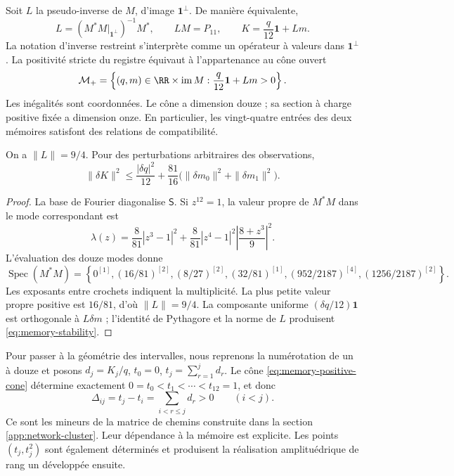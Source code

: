 Soit \(L\) la pseudo-inverse de \(M\), d’image
\(\mathbf1^\perp\). De manière équivalente,
\[
 L=\left(M^*M\big|_{\mathbf1^\perp}\right)^{-1}M^*,
 \qquad LM=P_{11},\qquad K=\frac q{12}\mathbf1+Lm.
\]
La notation d’inverse restreint s’interprète comme un opérateur à
valeurs dans \(\mathbf1^\perp\). La positivité stricte du registre
équivaut à l’appartenance au cône ouvert
\begin{equation}
 \mathcal M_+=\left\{(q,m)\in\RR\times\operatorname{im}M:
 \frac q{12}\mathbf1+Lm>0\right\}.
 \label{eq:memory-positive-cone}
\end{equation}
Les inégalités sont coordonnées. Le cône a dimension douze ; sa section
à charge positive fixée a dimension onze. En particulier, les vingt-quatre
entrées des deux mémoires satisfont des relations de compatibilité.

\begin{proposition}
\label{prop:memory-stability}
On a \(\|L\|=9/4\). Pour des perturbations arbitraires des observations,
\begin{equation}
 \|\delta K\|^2\leq\frac{|\delta q|^2}{12}
 +\frac{81}{16}\bigl(\|\delta m_0\|^2+\|\delta m_1\|^2\bigr).
 \label{eq:memory-stability}
\end{equation}
\end{proposition}
\begin{proof}
La base de Fourier diagonalise \(\mathsf S\). Si \(z^{12}=1\), la valeur propre de \(M^*M\) dans le mode correspondant est
\[
 \lambda(z)=\frac8{81}|z^3-1|^2
 +\frac8{81}|z^4-1|^2\left|\frac{8+z^3}{9}\right|^2.
\]
L’évaluation des douze modes donne
\[
 \operatorname{Spec}(M^*M)=
 \left\{0^{[1]},(16/81)^{[2]},(8/27)^{[2]},(32/81)^{[1]},
 (952/2187)^{[4]},(1256/2187)^{[2]}\right\}.
\]
Les exposants entre crochets indiquent la multiplicité. La plus petite valeur propre
positive est \(16/81\), d’où \(\|L\|=9/4\). La composante uniforme
\((\delta q/12)\mathbf1\) est orthogonale à \(L\delta m\) ; l’identité
de Pythagore et la norme de \(L\) produisent \eqref{eq:memory-stability}.
\end{proof}

Pour passer à la géométrie des intervalles, nous reprenons la numérotation de un à douze
et posons \(d_j=K_j/q\), \(t_0=0\),
\(t_j=\sum_{r=1}^j d_r\). Le cône \eqref{eq:memory-positive-cone}
détermine exactement \(0=t_0<t_1<\cdots<t_{12}=1\), et donc
\[
 \Delta_{ij}=t_j-t_i=\sum_{i<r\leq j}d_r>0\qquad(i<j).
\]
Ce sont les mineurs de la matrice de chemins construite dans la section \ref{app:network-cluster}. Leur dépendance à la mémoire est explicite. Les points \((t_j,t_j^2)\) sont également déterminés et produisent la réalisation amplituédrique de rang un développée ensuite.

